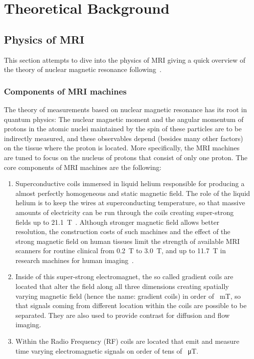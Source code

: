\chapter{Theoretical Background}

\section{Physics of MRI}

This section attempts to dive into the physics of MRI giving a quick overview of the theory of nuclear magnetic resonance following~\cite{nishimura_principles_1996, kurzhunov_novel_2017, pooley_fundamental_2005}.

\subsection{Components of MRI machines}
The theory of measurements based on nuclear magnetic resonance has its root in quantum physics: The nuclear magnetic moment and the angular momentum of protons in the atomic nuclei maintained by the spin of these particles are to be indirectly measured, and these observables depend (besides many other factors) on the tissue where the proton is located. More specifically, the MRI
machines are tuned to focus on the nucleus of protons that consist of only one proton. The core components of MRI machines are the following:
\begin{enumerate}
    \item Superconductive coils immersed in liquid helium responsible for producing a almost perfectly homogeneous and static magnetic field. The role of the liquid helium is to keep the wires at superconducting temperature, so that massive amounts of electricity can be run through the coils creating super-strong fields up to \SI{21.1}{\tesla}~\cite{schepkin_vivo_2012}. Although stronger magnetic field allows better resolution, the construction costs of such machines and the effect of the strong magnetic field on human tissues limit the strength of available MRI scanners for routine clinical from \SI{0.2}{\tesla} to \SI{3.0}{\tesla}, and up to \SI{11.7}{\tesla} in research machines for human imaging~\cite{ladd_pros_2018}.
    \item Inside of this super-strong electromagnet, the so called gradient coils are located that alter the field along all three dimensions creating spatially varying magnetic field (hence the name: gradient coils) in order of \SI{}{\milli\tesla}, so that signals coming from different location within the coils are possible to be separated. They are also used to provide contrast for diffusion and flow imaging.
    \item Within the Radio Frequency (RF) coils are located that emit and measure time varying electromagnetic signals on order of tens of \SI{}{\micro\tesla}.
\end{enumerate}
